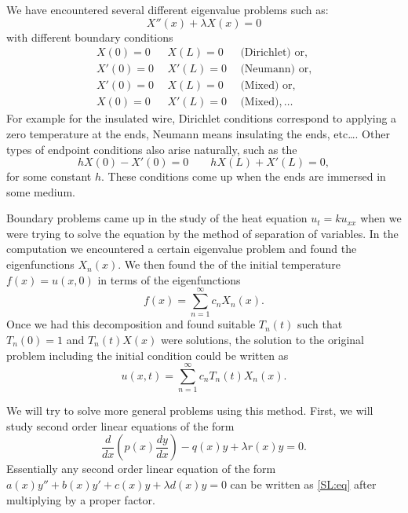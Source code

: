 \documentclass[12pt]{book}
\begin{document}
We have encountered several different eigenvalue problems such as:
\begin{equation*}
X''(x) + \lambda X(x) = 0
\end{equation*}
with different boundary
conditions%
%
\begin{equation*}
\begin{array}{rrl}
X(0) = 0 & ~~X(L) = 0 & ~~\text{(Dirichlet) or}, \\
X'(0) = 0 & ~~X'(L) = 0 & ~~\text{(Neumann) or}, \\
X'(0) = 0 & ~~X(L) = 0 & ~~\text{(Mixed) or}, \\
X(0) = 0 & ~~X'(L) = 0 & ~~\text{(Mixed)}, \ldots
\end{array}
\end{equation*}
For example for the insulated wire,
Dirichlet conditions correspond to applying a
zero temperature at the ends, Neumann means insulating the ends, etc\ldots.
Other types of endpoint conditions also arise naturally, such as
the \emph{}
\begin{equation*}
hX(0) - X'(0) = 0 \qquad hX(L) + X'(L) = 0 ,
\end{equation*}
for some constant $h$.  These conditions come up when the ends are immersed
in some medium.

Boundary problems came up in the study of the heat equation $u_t =
k u_{xx}$ when we were trying to solve the equation by the method of
separation of
variables.  In the computation
we encountered a certain eigenvalue problem and found the
eigenfunctions
$X_n(x)$.  We then found the \emph{} of
the initial
temperature $f(x) = u(x,0)$ in terms of the eigenfunctions
\begin{equation*}
f(x) = \sum_{n=1}^\infty c_n X_n(x) .
\end{equation*}
Once we had this decomposition
and found suitable $T_n(t)$ such that $T_n(0) = 1$
and $T_n(t)X(x)$ were solutions,
the solution to the original problem including the initial
condition could be written as
\begin{equation*}
u(x,t) = \sum_{n=1}^\infty c_n T_n(t) X_n(x) .
\end{equation*}

\medskip

We will try to solve more general problems using this method.
First,
we will study 
second order linear equations of the form
\begin{equation} \label{SL:eq}
\frac{d}{dx} \left( p(x) \frac{dy}{dx} \right)
- q(x) y + \lambda r(x) y = 0 .
\end{equation}
Essentially
any second order linear equation
of the form $a(x) y'' + b(x) y' + c(x) y + \lambda d(x) y = 0$
can be written as \eqref{SL:eq}
after multiplying by a proper factor.
\end{document}
